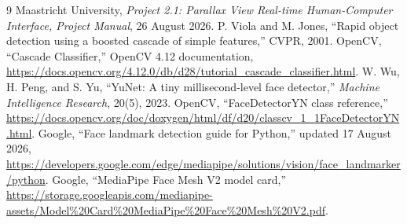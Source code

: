 \documentclass[9pt,a4paper,twocolumn]{article}
\begin{document}
\begin{thebibliography}{9}\small
{} Maastricht University, \emph{Project 2.1: Parallax View Real-time Human-Computer Interface, Project Manual}, 26 August 2026.
 P. Viola and M. Jones, ``Rapid object detection using a boosted cascade of simple features,'' CVPR, 2001.
 OpenCV, ``Cascade Classifier,'' OpenCV 4.12 documentation, \url{https://docs.opencv.org/4.12.0/db/d28/tutorial_cascade_classifier.html}.
 W. Wu, H. Peng, and S. Yu, ``YuNet: A tiny millisecond-level face detector,'' \emph{Machine Intelligence Research}, 20(5), 2023.
 OpenCV, ``FaceDetectorYN class reference,'' \url{https://docs.opencv.org/doc/doxygen/html/df/d20/classcv_1_1FaceDetectorYN.html}.
 Google, ``Face landmark detection guide for Python,'' updated 17 August 2026, \url{https://developers.google.com/edge/mediapipe/solutions/vision/face_landmarker/python}.
 Google, ``MediaPipe Face Mesh V2 model card,'' \url{https://storage.googleapis.com/mediapipe-assets/Model%20Card%20MediaPipe%20Face%20Mesh%20V2.pdf}.
\end{thebibliography}
\end{document}
